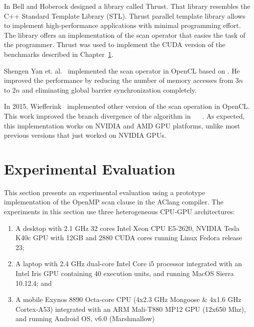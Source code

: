 \documentclass[Ingles]{ic-tese-v1}
\newcommand{\rcap}[1]{Chapter~\ref{cap:#1}}
\begin{document}
In  \cite{Nathan:2011} Bell  and  Hoberock designed  a library  called
Thrust.   That library  resembles  the C++  Standard Template  Library
(STL).   Thrust  parallel   template  library   allows  to   implement
high-performance  applications with  minimal  programming effort.  The
library offers an implementation of the scan operator that easies the task of
the programmer.  Thrust  was used  to implement  the CUDA version of the
benchmarks described in \rcap{Experiments}.

Shengen Yan et.  al.~\cite{Yan:2013}  implemented the scan operator in
OpenCL based on \cite{harris2007parallel}.  He improved the performance
by  reducing the  number  of memory  accesses from  $3n$  to $2n$  and
eliminating global barrier synchronization completely.

In 2015, Wiefferink~\cite{ScanOpenCL} implemented other version of the
scan operation in OpenCL.  This work improved the branch divergence of
the  algorithm in  ~\cite{ScanAsPrimitive} ~\cite{harris2007parallel}.
As  expected,  this  implementation  works   on  NVIDIA  and  AMD  GPU
platforms, unlike  most previous versions  that just worked  on NVIDIA
GPUs.

\chapter{Experimental Evaluation}
\label{cap:Experiments}

This  section presents  an experimental  evaluation using  a prototype
implementation of  the OpenMP scan  clause in the AClang compiler.
The  experiments in this section  use  three   heterogeneous  CPU-GPU
architectures:


\begin{enumerate}
	\item A desktop with 2.1 GHz 32 cores Intel Xeon CPU E5-2620,
	NVIDIA Tesla K40c GPU with 12GB and 2880 CUDA cores  running
	Linux Fedora  release 23;
	\item  A laptop  with  2.4  GHz dual-core  Intel  Core  i5  processor
	integrated with an Intel Iris GPU containing 40 execution units, and
	running MacOS Sierra 10.12.4; and
	\item A mobile  Exynos 8890 Octa-core  CPU (4x2.3 GHz Mongoose  \& 4x1.6
	GHz Cortex-A53)  integrated with an  ARM Mali-T880 MP12  GPU (12x650
	Mhz), and running Android OS, v6.0 (Marshmallow)
\end{enumerate}
\end{document}
